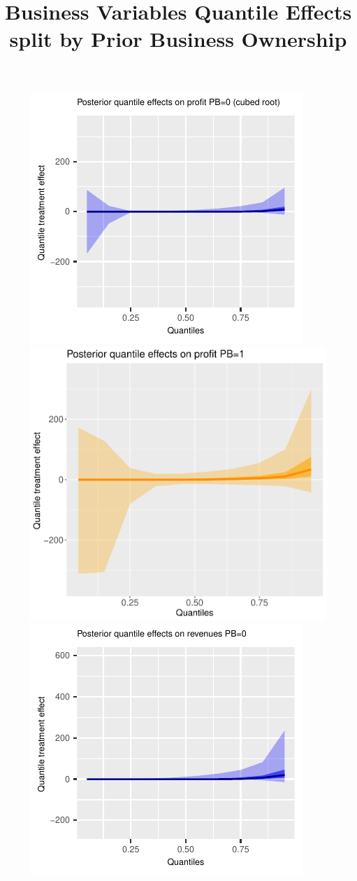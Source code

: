\documentclass[english,12pt]{article}\usepackage{lmodern}
\numberwithin{equation}{section}
\begin{document}
 \begin{figure}[h!]
  \centering
    \title{Business Variables Quantile Effects split by Prior Business Ownership}
    \includegraphics[scale=0.45]{posterior_parent_quantile_TEs_profit_pb_0_lognormal.pdf}
    \includegraphics[scale=0.45]{posterior_parent_quantile_TEs_profit_pb_1_lognormal.pdf}\\
    \includegraphics[scale=0.45]{posterior_parent_quantile_TEs_revenues_pb_0_lognormal.pdf}

\end{figure}
\end{document}

